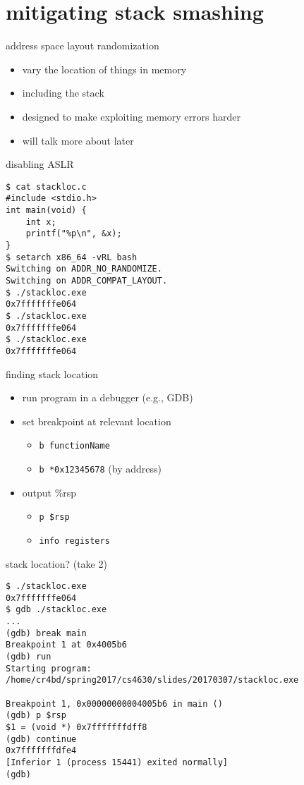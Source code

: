 \section{mitigating stack smashing}
\begin{frame}{address space layout randomization}
    \begin{itemize}
    \item vary the location of things in memory
    \item including the stack
    \item designed to make exploiting memory errors harder
    \item will talk more about later
    \end{itemize}
\end{frame}

\begin{frame}[fragile,label=stackLoc2]{disabling ASLR}
\vspace{-.5cm}
\begin{Verbatim}[fontsize=\fontsize{9}{10}\selectfont]
$ cat stackloc.c
#include <stdio.h>
int main(void) {
    int x;
    printf("%p\n", &x);
}
$ setarch x86_64 -vRL bash
Switching on ADDR_NO_RANDOMIZE.
Switching on ADDR_COMPAT_LAYOUT.
$ ./stackloc.exe 
0x7fffffffe064
$ ./stackloc.exe 
0x7fffffffe064
$ ./stackloc.exe 
0x7fffffffe064
\end{Verbatim}
\end{frame}

\begin{frame}{finding stack location}
\begin{itemize}
\item run program in a debugger (e.g., GDB)
\item set breakpoint at relevant location 
    \begin{itemize}
    \item {\tt b functionName}
    \item {\tt b *0x12345678} (by address)
    \end{itemize}
\item output \%rsp
    \begin{itemize}
    \item {\tt p \$rsp}
    \item {\tt info registers}
    \end{itemize}
\end{itemize}
\end{frame}

\begin{frame}[fragile,label=stackLoc3]{stack location? (take 2)}
\begin{Verbatim}[fontsize=\fontsize{9}{10}\selectfont]
$ ./stackloc.exe 
0x7fffffffe064
$ gdb ./stackloc.exe
...
(gdb) break main
Breakpoint 1 at 0x4005b6
(gdb) run
Starting program: /home/cr4bd/spring2017/cs4630/slides/20170307/stackloc.exe 

Breakpoint 1, 0x00000000004005b6 in main ()
(gdb) p $rsp
$1 = (void *) 0x7fffffffdff8
(gdb) continue
0x7fffffffdfe4
[Inferior 1 (process 15441) exited normally]
(gdb) 
\end{Verbatim}
\end{frame}


